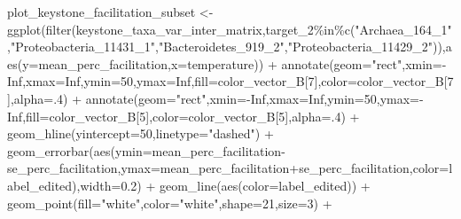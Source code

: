 \documentclass[
  letterpaper,
  DIV=11,
  numbers=noendperiod]{scrreprt}
\newenvironment{Shaded}{\begin{snugshade}}{\end{snugshade}}
\newcommand{\AttributeTok}[1]{\textcolor[rgb]{0.40,0.45,0.13}{#1}}
\newcommand{\ConstantTok}[1]{\textcolor[rgb]{0.56,0.35,0.01}{#1}}
\newcommand{\DecValTok}[1]{\textcolor[rgb]{0.68,0.00,0.00}{#1}}
\newcommand{\FloatTok}[1]{\textcolor[rgb]{0.68,0.00,0.00}{#1}}
\newcommand{\FunctionTok}[1]{\textcolor[rgb]{0.28,0.35,0.67}{#1}}
\newcommand{\NormalTok}[1]{\textcolor[rgb]{0.00,0.23,0.31}{#1}}
\newcommand{\OtherTok}[1]{\textcolor[rgb]{0.00,0.23,0.31}{#1}}
\newcommand{\SpecialCharTok}[1]{\textcolor[rgb]{0.37,0.37,0.37}{#1}}
\newcommand{\StringTok}[1]{\textcolor[rgb]{0.13,0.47,0.30}{#1}}
\begin{document}
\begin{Shaded}
\begin{Highlighting}[]
\NormalTok{plot\_keystone\_facilitation\_subset }\OtherTok{\textless{}{-}} \FunctionTok{ggplot}\NormalTok{(}\FunctionTok{filter}\NormalTok{(keystone\_taxa\_var\_inter\_matrix,target\_2}\SpecialCharTok{\%in\%}\FunctionTok{c}\NormalTok{(}\StringTok{"Archaea\_164\_1"}\NormalTok{,}\StringTok{"Proteobacteria\_11431\_1"}\NormalTok{,}\StringTok{"Bacteroidetes\_919\_2"}\NormalTok{,}\StringTok{"Proteobacteria\_11429\_2"}\NormalTok{)),}\FunctionTok{aes}\NormalTok{(}\AttributeTok{y=}\NormalTok{mean\_perc\_facilitation,}\AttributeTok{x=}\NormalTok{temperature)) }\SpecialCharTok{+}
  \FunctionTok{annotate}\NormalTok{(}\AttributeTok{geom=}\StringTok{"rect"}\NormalTok{,}\AttributeTok{xmin=}\SpecialCharTok{{-}}\ConstantTok{Inf}\NormalTok{,}\AttributeTok{xmax=}\ConstantTok{Inf}\NormalTok{,}\AttributeTok{ymin=}\DecValTok{50}\NormalTok{,}\AttributeTok{ymax=}\ConstantTok{Inf}\NormalTok{,}\AttributeTok{fill=}\NormalTok{color\_vector\_B[}\DecValTok{7}\NormalTok{],}\AttributeTok{color=}\NormalTok{color\_vector\_B[}\DecValTok{7}\NormalTok{],}\AttributeTok{alpha=}\NormalTok{.}\DecValTok{4}\NormalTok{) }\SpecialCharTok{+}
  \FunctionTok{annotate}\NormalTok{(}\AttributeTok{geom=}\StringTok{"rect"}\NormalTok{,}\AttributeTok{xmin=}\SpecialCharTok{{-}}\ConstantTok{Inf}\NormalTok{,}\AttributeTok{xmax=}\ConstantTok{Inf}\NormalTok{,}\AttributeTok{ymin=}\DecValTok{50}\NormalTok{,}\AttributeTok{ymax=}\SpecialCharTok{{-}}\ConstantTok{Inf}\NormalTok{,}\AttributeTok{fill=}\NormalTok{color\_vector\_B[}\DecValTok{5}\NormalTok{],}\AttributeTok{color=}\NormalTok{color\_vector\_B[}\DecValTok{5}\NormalTok{],}\AttributeTok{alpha=}\NormalTok{.}\DecValTok{4}\NormalTok{) }\SpecialCharTok{+}
  \FunctionTok{geom\_hline}\NormalTok{(}\AttributeTok{yintercept=}\DecValTok{50}\NormalTok{,}\AttributeTok{linetype=}\StringTok{"dashed"}\NormalTok{) }\SpecialCharTok{+}
  \FunctionTok{geom\_errorbar}\NormalTok{(}\FunctionTok{aes}\NormalTok{(}\AttributeTok{ymin=}\NormalTok{mean\_perc\_facilitation}\SpecialCharTok{{-}}\NormalTok{se\_perc\_facilitation,}\AttributeTok{ymax=}\NormalTok{mean\_perc\_facilitation}\SpecialCharTok{+}\NormalTok{se\_perc\_facilitation,}\AttributeTok{color=}\NormalTok{label\_edited),}\AttributeTok{width=}\FloatTok{0.2}\NormalTok{) }\SpecialCharTok{+}
  \FunctionTok{geom\_line}\NormalTok{(}\FunctionTok{aes}\NormalTok{(}\AttributeTok{color=}\NormalTok{label\_edited)) }\SpecialCharTok{+}
  \FunctionTok{geom\_point}\NormalTok{(}\AttributeTok{fill=}\StringTok{"white"}\NormalTok{,}\AttributeTok{color=}\StringTok{"white"}\NormalTok{,}\AttributeTok{shape=}\DecValTok{21}\NormalTok{,}\AttributeTok{size=}\DecValTok{3}\NormalTok{) }\SpecialCharTok{+}

\end{Highlighting}
\end{Shaded}
\end{document}
